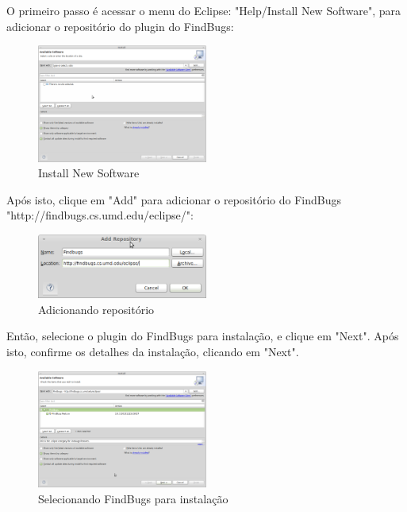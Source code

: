 \documentclass[12pt,journal,compsoc]{IEEEtran}
\begin{document}
O primeiro passo é acessar o menu do Eclipse: "Help/Install New Software", para adicionar o repositório do plugin do FindBugs\cite{FindBugs_eclipse_plugin}:

\begin{figure}[ht!]
\centering
\includegraphics[width=0.5\textwidth]{img/eclipse-findbugs-01}
\caption{Install New Software}
\label{eclipse-findbugs-01}
\end{figure}

Após isto, clique em "Add" para adicionar o repositório do FindBugs "http://findbugs.cs.umd.edu/eclipse/":

\begin{figure}[ht!]
\centering
\includegraphics[width=0.5\textwidth]{img/eclipse-findbugs-02}
\caption{Adicionando repositório}
\label{eclipse-findbugs-02}
\end{figure} 

Então, selecione o plugin do FindBugs para instalação, e clique em "Next". Após isto, confirme os detalhes da instalação, clicando em "Next".

\begin{figure}[ht!]
\centering
\includegraphics[width=0.5\textwidth]{img/eclipse-findbugs-03}
\caption{Selecionando FindBugs para instalação}
\label{eclipse-findbugs-03}
\end{figure} 
\end{document}
